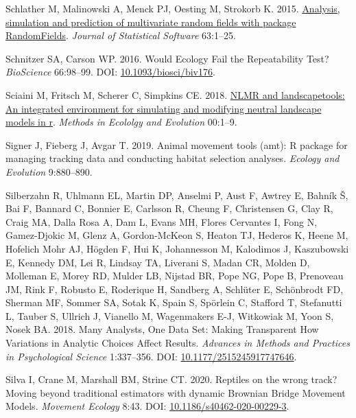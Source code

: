 \documentclass[10pt,a4paper]{article}
\newlength{\cslhangindent}
\newlength{\cslentryspacingunit} %
\newenvironment{CSLReferences}[2] %
 {%
  \setlength{\parindent}{0pt}
  \ifodd #1
  \let\oldpar\par
  \def\par{\hangindent=\cslhangindent\oldpar}
  \fi
  \setlength{\parskip}{#2\cslentryspacingunit}
 }%
 {}
\begin{document}
\begin{CSLReferences}{1}{0}
\leavevmode{}%
Schlather M, Malinowski A, Menck PJ, Oesting M, Strokorb K. 2015. \href{https://www.jstatsoft.org/v63/i08/}{Analysis, simulation and prediction of multivariate random fields with package {RandomFields}}. \emph{Journal of Statistical Software} 63:1--25.

\leavevmode{}%
Schnitzer SA, Carson WP. 2016. Would {Ecology} {Fail} the {Repeatability} {Test}? \emph{BioScience} 66:98--99. DOI: \href{https://doi.org/10.1093/biosci/biv176}{10.1093/biosci/biv176}.

\leavevmode{}%
Sciaini M, Fritsch M, Scherer C, Simpkins CE. 2018. \href{https://doi.org/10.1111/2041-210X.13076}{NLMR and landscapetools: An integrated environment for simulating and modifying neutral landscape models in r}. \emph{Methods in Ecololgy and Evolution} 00:1--9.

\leavevmode{}%
Signer J, Fieberg J, Avgar T. 2019. Animal movement tools (amt): R package for managing tracking data and conducting habitat selection analyses. \emph{Ecology and Evolution} 9:880--890.

\leavevmode{}%
Silberzahn R, Uhlmann EL, Martin DP, Anselmi P, Aust F, Awtrey E, Bahník Š, Bai F, Bannard C, Bonnier E, Carlsson R, Cheung F, Christensen G, Clay R, Craig MA, Dalla Rosa A, Dam L, Evans MH, Flores Cervantes I, Fong N, Gamez-Djokic M, Glenz A, Gordon-McKeon S, Heaton TJ, Hederos K, Heene M, Hofelich Mohr AJ, Högden F, Hui K, Johannesson M, Kalodimos J, Kaszubowski E, Kennedy DM, Lei R, Lindsay TA, Liverani S, Madan CR, Molden D, Molleman E, Morey RD, Mulder LB, Nijstad BR, Pope NG, Pope B, Prenoveau JM, Rink F, Robusto E, Roderique H, Sandberg A, Schlüter E, Schönbrodt FD, Sherman MF, Sommer SA, Sotak K, Spain S, Spörlein C, Stafford T, Stefanutti L, Tauber S, Ullrich J, Vianello M, Wagenmakers E-J, Witkowiak M, Yoon S, Nosek BA. 2018. Many {Analysts}, {One} {Data} {Set}: {Making} {Transparent} {How} {Variations} in {Analytic} {Choices} {Affect} {Results}. \emph{Advances in Methods and Practices in Psychological Science} 1:337--356. DOI: \href{https://doi.org/10.1177/2515245917747646}{10.1177/2515245917747646}.

\leavevmode{}%
Silva I, Crane M, Marshall BM, Strine CT. 2020. Reptiles on the wrong track? {Moving} beyond traditional estimators with dynamic {Brownian} {Bridge} {Movement} {Models}. \emph{Movement Ecology} 8:43. DOI: \href{https://doi.org/10.1186/s40462-020-00229-3}{10.1186/s40462-020-00229-3}.


\end{CSLReferences}
\end{document}

